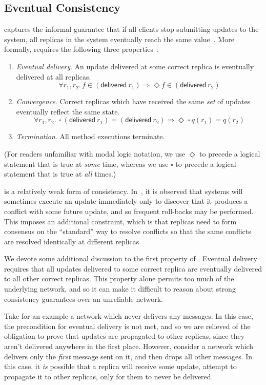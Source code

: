 \subsection{Eventual Consistency}
\EC captures the informal guarantee that if all clients stop submitting updates
to the system, all replicas in the system eventually reach the same
value~\citep{shapiro11}. More formally, \EC requires the following three
properties~\citep{shapiro11}:
\begin{enumerate}
  \item \emph{Eventual delivery}. An update delivered at some correct replica is
    eventually delivered at all replicas.
    \[
      \forall r_1, r_2.\, f \in (\textsf{delivered}~r_1) \Rightarrow \Diamond f
      \in (\textsf{delivered}~r_2)
    \]
  \item \emph{Convergence}. Correct replicas which have received the same
    \emph{set} of updates eventually reflect the same state.
    \[
      \forall r_1, r_2.\,~\square~(\textsf{delivered}~r_1) =
      (\textsf{delivered}~r_2) \Rightarrow \Diamond~\square~q(r_1) = q(r_2)
    \]
  \item \emph{Termination}. All method executions terminate.
\end{enumerate}

(For readers unfamiliar with modal logic notation, we use $\Diamond$ to precede
a logical statement that is true at \emph{some} time, whereas we use $\square$
to precede a logical statement that is true at \emph{all} times.)

\EC is a relatively weak form of consistency. In~\citet{shapiro11}, it is
observed that \EC systems will sometimes execute an update immediately only to
discover that it produces a conflict with some future update, and so frequent
roll-backs may be performed. This imposes an additional constraint, which is
that replicas need to form consensus on the ``standard'' way to resolve
conflicts so that the same conflicts are resolved identically at different
replicas.

We devote some additional discussion to the first property of \EC. Eventual
delivery requires that all updates delivered to some correct replica are
eventually delivered to all other correct replicas. This property alone permits
too much of the underlying network, and so it can make it difficult to reason
about strong consistency guarantees over an unreliable network.

Take for an example a network which never delivers any messages. In this case,
the precondition for eventual delivery is not met, and so we are relieved of the
obligation to prove that updates are propagated to other replicas, since they
aren't delivered anywhere in the first place. However, consider a network which
delivers only the \emph{first} message sent on it, and then drops all other
messages. In this case, it \emph{is} possible that a replica will receive some
update, attempt to propagate it to other replicas, only for them to never be
delivered.

